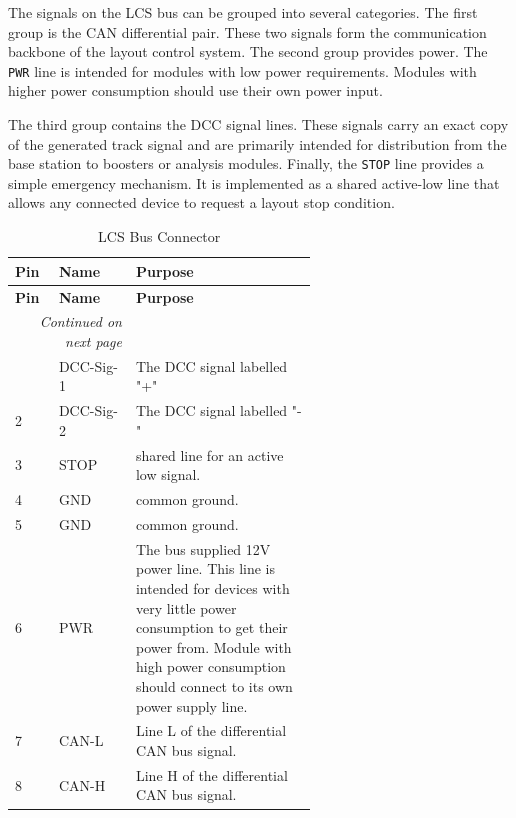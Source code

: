 The signals on the LCS bus can be grouped into several categories.
The first group is the CAN differential pair. These two signals form the communication backbone of 
the layout control system.
The second group provides power. The \texttt{PWR} line is intended for modules with low power 
requirements. Modules with higher power consumption should use their own power input.

The third group contains the DCC signal lines. These signals carry an exact copy of the generated 
track signal and are primarily intended for distribution from the base station to boosters or 
analysis modules.
Finally, the \texttt{STOP} line provides a simple emergency mechanism. It is implemented as a shared 
active-low line that allows any connected device to request a layout stop condition.

\begin{longtable}{@{}|l|l|p{0.6\linewidth}|@{}}
    \caption{LCS Bus Connector} \\
    \toprule
    \textbf{Pin} & \textbf{Name} & \textbf{Purpose} \\
    \midrule
    \endfirsthead
    \toprule
    \textbf{Pin} & \textbf{Name} & \textbf{Purpose} \\
    \midrule
    \endhead
    \midrule
    \multicolumn{2}{r}{\textit{Continued on next page}} \\
    \midrule
    \endfoot
    \bottomrule
    \endlastfoot
    1 & DCC-Sig-1 & The DCC signal labelled "+" \\
    \midrule
    2 & DCC-Sig-2 & The DCC signal labelled "-" \\
    \midrule
    3 & STOP & shared line for an active low signal. \\
    \midrule
    4 & GND & common ground. \\
    \midrule
    5 & GND & common ground. \\
    \midrule
    6 & PWR & The bus supplied 12V power line. This line is intended for devices with very little power consumption to get their power from. Module with high power consumption should connect to its own power supply line. \\
    \midrule
    7 & CAN-L &  Line L of the differential CAN bus signal. \\
    \midrule
    8 & CAN-H &  Line H of the differential CAN bus signal. \\
\end{longtable}
\FloatBarrier


